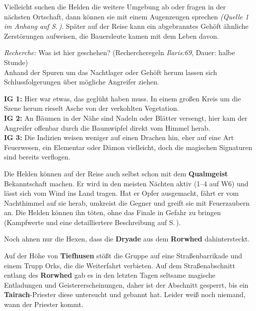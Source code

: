 Vielleicht suchen die Helden die weitere Umgebung ab oder fragen in der nächsten Ortschaft, dann können sie mit einem Augenzeugen sprechen \emph{(Quelle 1 im Anhang auf S.\,\pageref{aiw_quelle1})}.
Später auf der Reise kann ein abgebranntes Gehöft ähnliche Zerstörungen aufweisen, die Bauersleute kamen mit dem Leben davon.


{\emph{Recherche:} Was ist hier geschehen? (Rechercheregeln \emph{Ilaris:69}, Dauer: halbe Stunde)\\
Anhand der Spuren um das Nachtlager oder Gehöft herum lassen sich Schlussfolgerungen über mögliche Angreifer ziehen.

\textbf{IG 1:} Hier war etwas, das geglüht haben muss. In einem großen Kreis um die Szene herum rieselt Asche von der verkohlten Vegetation.\\
\textbf{IG 2:} An Bäumen in der Nähe sind Nadeln oder Blätter versengt, hier kam der Angreifer offenbar durch die Baumwipfel direkt vom Himmel herab.\\
\textbf{IG 3:} Die Indizien weisen weniger auf einen Drachen hin, eher auf eine Art Feuerwesen, ein Elementar oder Dämon vielleicht, doch die magischen Signaturen sind bereits verflogen.
}

Die Helden können auf der Reise auch selbst schon mit dem \textbf{Qualmgeist} Bekanntschaft machen.
Er wird in den meisten Nächten aktiv (1--4 auf W6) und lässt sich vom Wind ins Land tragen.
Hat er Opfer ausgemacht, fährt er vom Nachthimmel auf sie herab, umkreist die Gegner und greift sie mit Feuerzaubern an.
Die Helden können ihn töten, ohne das Finale in Gefahr zu bringen (Kampfwerte und eine detailliertere Beschreibung auf S.\,\pageref{geist}).

Noch ahnen nur die Hexen, dass die \textbf{Dryade} aus dem \textbf{Rorwhed} dahintersteckt.



Auf der Höhe von \textbf{Tiefhusen} stößt die Gruppe auf eine Straßenbarrikade und einem Trupp Orks, die die Weiterfahrt
verbieten.
Auf dem Straßenabschnitt entlang des \textbf{Rorwhed} gab es in den letzten Tagen seltsame magische Entladungen und
Geistererscheinungen, daher ist der Abschnitt gesperrt, bis ein \textbf{Tairach}-Priester diese untersucht und gebannt hat.
Leider weiß noch niemand, wann der Priester kommt.

